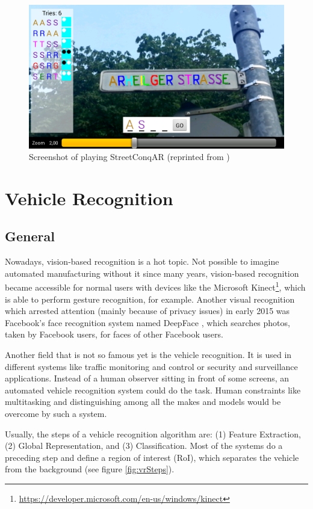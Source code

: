 \begin{figure}[bth]
  \centering
        \includegraphics[width=.65\linewidth]{gfx/streetconqar_gameplay_reprint}
        \caption{Screenshot of playing StreetConqAR (reprinted from \citep{hock2014augmented})}
        \label{fig:streetConqARGameplay}
\end{figure}


\section{Vehicle Recognition}

\subsection{General}
Nowadays, vision-based recognition is a hot topic. Not possible to imagine automated manufacturing without it since many years, vision-based recognition became accessible for normal users with devices like the Microsoft Kinect\footnote{\url{https://developer.microsoft.com/en-us/windows/kinect}}, which is able to perform gesture recognition, for example. Another visual recognition which arrested attention (mainly because of privacy issues) in early 2015 was Facebook's face recognition system named DeepFace \citep{deepFace}, which searches photos, taken by Facebook users, for faces of other Facebook users.

Another field that is not so famous yet is the vehicle recognition. It is used in different systems like traffic monitoring and control or security and surveillance applications. Instead of a human observer sitting in front of some screens, an automated vehicle recognition system could do the task. Human constraints like multitasking and distinguishing among all the makes and models would be overcome by such a system.

Usually, the steps of a vehicle recognition algorithm are: (1) Feature Extraction, (2) Global Representation, and (3) Classification. Most of the systems do a preceding step and define a region of interest (RoI), which separates the vehicle from the background (see figure \ref{fig:vrSteps}).

